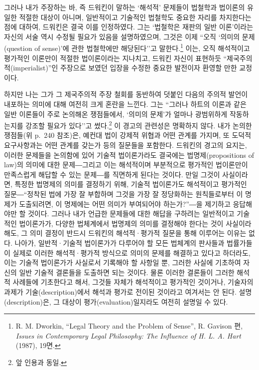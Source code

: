 그러나 내가 주장하는 바, 즉 드워킨이 말하는 `해석적' 문제들이 법철학과
법이론의 유일한 적절한 대상이 아니며, 일반적이고 기술적인 법철학도
중요한 자리를 차지한다는 점에 대하여, 드워킨은 결국 이를 인정하였다.
그는 `법철학은 재판의 일반 이론'이라는 자신의 서술 역시 수정될 필요가
있음을 설명하였으며, 그것은 이제 ``오직 `의미의 문제(question of
sense)'에 관한 법철학에만 해당된다''고 말한다.\footnote{R. M. Dworkin,
  ``Legal Theory and the Problem of Sense'', R. Gavison 편, \emph{Issues
  in Contemporary Legal Philosophy: The Influence of H. L. A. Hart}
  (1987), 19면.} 이는, 오직 해석적이고 평가적인 이론만이 적절한
법이론이라는 지나치고, 드워킨 자신이 표현하듯
``제국주의적(imperialist)''인 주장으로 보였던 입장을 수정한 중요한
발전이자 환영할 만한 교정이다.

하지만 나는 그가 그 제국주의적 주장 철회를 동반하여 덧붙인 다음의 주의적
발언이 내포하는 의미에 대해 여전히 크게 혼란을 느낀다. 그는 ``그러나
하트의 이론과 같은 일반 이론들이 주로 논의해온 쟁점들에서, `의미의
문제'가 얼마나 광범위하게 작동하는지를 강조할 필요가 있다''고
썼다.\footnote{앞 인용과 동일.} 이 경고의 관련성은 명확하지 않다. 내가
논의한 쟁점들(위 p.~240 참조)은, 예컨대 법이 강제적 위협과 어떤 관계를
가지며, 또 도덕적 요구사항과는 어떤 관계를 갖는가 등의 질문들을
포함한다. 드워킨의 경고의 요지는, 이러한 문제들을 논의함에 있어 기술적
법이론가라도 결국에는 법명제(propositions of law)의 의미에 대한
문제―그리고 이는 해석적이며 부분적으로 평가적인 법이론만이 만족스럽게
해답할 수 있는 문제―를 직면하게 된다는 것이다. 만일 그것이 사실이라면,
특정한 법명제의 의미를 결정하기 위해, 기술적 법이론가도 해석적이고
평가적인 질문―``정착된 법에 가장 잘 부합하며 그것을 가장 잘 정당화하는
원칙들로부터 이 명제가 도출되려면, 이 명제에는 어떤 의미가 부여되어야
하는가?''―을 제기하고 응답해야만 할 것이다. 그러나 내가 언급한 문제들에
대한 해답을 구하려는 일반적이고 기술적인 법이론가가, 다양한 법체계에서
법명제의 의미를 결정해야 한다는 것이 사실이라 해도, 그 의미 결정이
반드시 드워킨의 해석적·평가적 질문을 통해 이루어는
이유는 없다. 나아가, 일반적·기술적 법이론가가 다루어야 할 모든 법체계의
판사들과 법률가들이 실제로 이러한 해석적·평가적 방식으로 의미의 문제를
해결하고 있다고 하더라도, 이는 기술적 법이론가가 사실로서 기록해야 할
사항일 뿐, 그러한 사실에 기초하여 자신의 일반 기술적 결론들을 도출하면
되는 것이다. 물론 이러한 결론들이 그러한 해석적 사례들에 기초한다고
해서, 그것들 자체가 해석적이고 평가적인 것이거나, 기술자의 과제가
기술(description)에서 해석과 평가로 전이된 것이라고 여겨서는 안 된다.
설명(description)은, 그 대상이 평가(evaluation)일지라도 여전히 설명일 수
있다.

